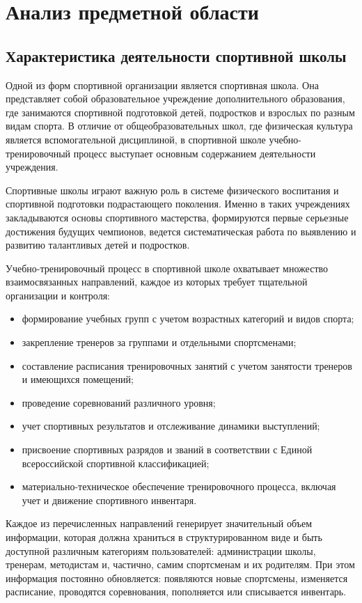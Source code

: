 \section{Анализ предметной области}

\subsection{Характеристика деятельности спортивной школы}

Одной из форм спортивной организации является спортивная школа. Она представляет собой образовательное учреждение дополнительного образования, где занимаются спортивной подготовкой детей, подростков и взрослых по разным видам спорта. В отличие от общеобразовательных школ, где физическая культура является вспомогательной дисциплиной, в спортивной школе учебно-тренировочный процесс выступает основным содержанием деятельности учреждения.

Спортивные школы играют важную роль в системе физического воспитания и спортивной подготовки подрастающего поколения. Именно в таких учреждениях закладываются основы спортивного мастерства, формируются первые серьезные достижения будущих чемпионов, ведется систематическая работа по выявлению и развитию талантливых детей и подростков.

Учебно-тренировочный процесс в спортивной школе охватывает множество взаимосвязанных направлений, каждое из которых требует тщательной организации и контроля:

\begin{itemize}
	\item формирование учебных групп с учетом возрастных категорий и видов спорта;
	\item закрепление тренеров за группами и отдельными спортсменами;
	\item составление расписания тренировочных занятий с учетом занятости тренеров и имеющихся помещений;
	\item проведение соревнований различного уровня;
	\item учет спортивных результатов и отслеживание динамики выступлений;
	\item присвоение спортивных разрядов и званий в соответствии с Единой всероссийской спортивной классификацией;
	\item материально-техническое обеспечение тренировочного процесса, включая учет и движение спортивного инвентаря.
\end{itemize}

Каждое из перечисленных направлений генерирует значительный объем информации, которая должна храниться в структурированном виде и быть доступной различным категориям пользователей: администрации школы, тренерам, методистам и, частично, самим спортсменам и их родителям. При этом информация постоянно обновляется: появляются новые спортсмены, изменяется расписание, проводятся соревнования, пополняется или списывается инвентарь.

